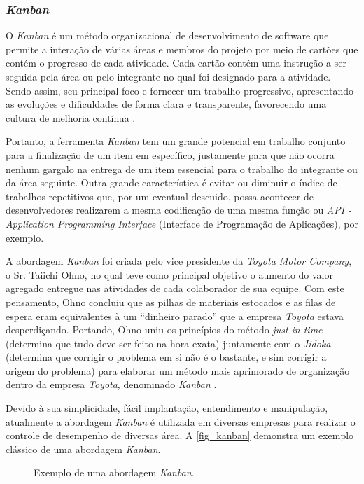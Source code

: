 \subsubsection{\textit{Kanban}}

O \textit{Kanban} é um método organizacional de desenvolvimento de software que permite a interação de várias áreas e membros do projeto por meio de cartões que contém o progresso de cada atividade. Cada cartão contém uma instrução a ser seguida pela área ou pelo integrante no qual foi designado para a atividade. Sendo assim, seu principal foco e fornecer um trabalho progressivo, apresentando as evoluções e dificuldades de forma clara e transparente, favorecendo uma cultura de melhoria contínua \cite{KANBAN2014}.

Portanto, a ferramenta \textit{Kanban} tem um grande potencial em trabalho conjunto para a finalização de um item em específico, justamente para que não ocorra nenhum gargalo na entrega de um item essencial para o trabalho do integrante ou da área seguinte. Outra grande característica é evitar ou diminuir o índice de trabalhos repetitivos que, por um eventual descuido, possa acontecer de desenvolvedores realizarem a mesma codificação de uma mesma função ou \textit{API - Application Programming Interface} (Interface de Programação de Aplicações), por exemplo.

A abordagem \textit{Kanban} foi criada pelo vice presidente da \textit{Toyota Motor Company}, o Sr. Taiichi Ohno, no qual teve como principal objetivo o aumento do valor agregado entregue nas atividades de cada colaborador de sua equipe. Com este pensamento,  Ohno concluiu que as pilhas de materiais estocados e as filas de espera eram equivalentes à um “dinheiro parado” que a empresa \textit{Toyota} estava desperdiçando. Portando,   Ohno uniu os princípios do método \textit{just in time} (determina que tudo deve ser feito na hora exata)  juntamente com o \textit{Jidoka} (determina que corrigir o problema em si não é o bastante, e sim corrigir a origem do problema) para elaborar um método mais aprimorado de organização dentro da empresa \textit{Toyota}, denominado \textit{Kanban} \cite{TOYOTA1977}.

Devido à sua simplicidade, fácil implantação, entendimento e manipulação, atualmente a abordagem \textit{Kanban} é utilizada em diversas empresas para realizar o controle de desempenho de diversas área. A \autoref{fig_kanban} demonstra um exemplo clássico de uma abordagem \textit{Kanban}.

\begin{figure}[h]
	\caption{\label{fig_kanban}Exemplo de uma abordagem \textit{Kanban}.}
	\begin{center}
	\end{center}
	\centering {}
\end{figure}